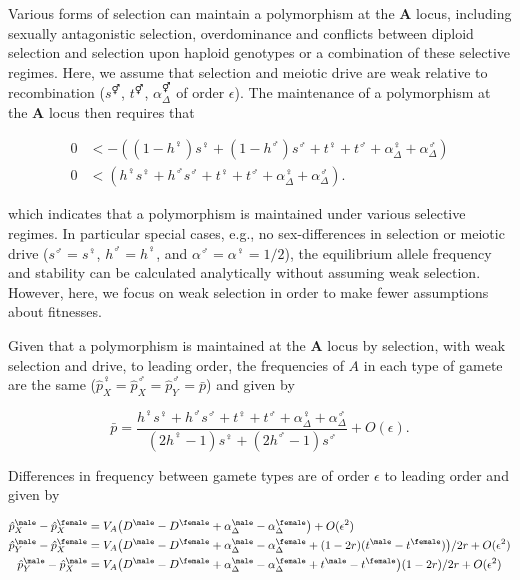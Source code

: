 \documentclass[12pt]{article}
\begin{document}
Various forms of selection can maintain a polymorphism at the \textbf{A} locus, including sexually antagonistic selection, overdominance and conflicts between diploid selection and selection upon haploid genotypes \citep[ploidally antagonistic selection,][]{Immler:2012tl} or a combination of these selective regimes. 
Here, we assume that selection and meiotic drive are weak relative to recombination ($s^\Hermaphrodite$, $t^\Hermaphrodite$, $\alpha_{\Delta}^\Hermaphrodite$ of order $\epsilon$). 
The maintenance of a polymorphism at the \textbf{A} locus then requires that

\begin{equation}
\begin{split}
0&<-((1-h^\female)s^\female +(1-h^\male) s^\male + t^\female +t^\male + \alpha_{\Delta}^\female+\alpha_{\Delta}^\male)\\
%
0&<(h^\female s^\female +h^\male s^\male + t^\female +t^\male + \alpha_{\Delta}^\female+\alpha_{\Delta}^\male).
\end{split}
\end{equation}

\noindent
which indicates that a polymorphism is maintained under various selective regimes. 
In particular special cases, e.g., no sex-differences in selection or meiotic drive ($s^\male=s^\female$, $h^\male=h^\female$, and $\alpha^\male=\alpha^\female=1/2$), the equilibrium allele frequency and stability can be calculated analytically without assuming weak selection. 
However, here, we focus on weak selection in order to make fewer assumptions about fitnesses. 

Given that a polymorphism is maintained at the \textbf{A} locus by selection, with weak selection and drive, to leading order, the frequencies of $A$ in each type of gamete are the same ($\hat{p}^\female_X=\hat{p}^\male_X=\hat{p}^\male_Y=\bar{p}$) and given by 

\begin{equation}
\bar{p}=\frac{h^\female s^\female + h^\male s^\male +t^\female+t^\male+\alpha_{\Delta}^\female+\alpha_{\Delta}^\male}
{(2h^\female-1)s^\female+(2h^\male-1)s^\male}
+O(\epsilon)
.
\label{eq:pAve}
\end{equation}

\noindent
Differences in frequency between gamete types are of order $\epsilon$ to leading order and given by

\begin{equation}
\begin{split}
\hat{p}^\male_X-\hat{p}^\female_X&=V_{A}\big{(}D^\male - D^\female +\alpha_{\Delta}^\male-\alpha_{\Delta}^\female \big{)}
+O(\epsilon^2)\\
%
\hat{p}^\male_Y-\hat{p}^\female_X&=V_{A}\big{(}D^\male - D^\female+\alpha_{\Delta}^\male-\alpha_{\Delta}^\female+(1-2r)(t^\male-t^\female)\big{)}/2r
+O(\epsilon^2)\\
%
\hat{p}^\male_Y-\hat{p}^\male_X&=V_{A}\big{(}D^\male - D^\female+\alpha_{\Delta}^\male-\alpha_{\Delta}^\female+t^\male-t^\female\big{)}(1-2r)/2r
+O(\epsilon^2)
\end{split}
\label{eq:freq_diffs}
\end{equation}
\end{document}
